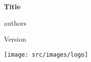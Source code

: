 \documentclass[oneside]{book}
\title{}
\author{}
\date{%
    \today

    Version: 0.1.1

    \begin{figure}
        \centering
        \texttt{[image: src/images/logo]}
    \end{figure}
}
\begin{document}
\begin{titlepage}
    \centering
    \vfill
    {\bfseries\Large
        Title
        
        \vskip2cm

        authors
        
        \vskip2cm

        Version
        \\
    }    
    \vfill
    \texttt{[image: src/images/logo]}
    \vfill
    \vfill
\end{titlepage}
\clearpage

\tableofcontents
\clearpage


 

\frontmatter


\clearpage


\mainmatter


\clearpage


\backmatter

\printglossary[type=\acronymtype]
\clearpage
\clearpage

\end{document}
